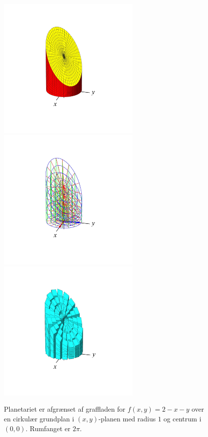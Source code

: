 \begin{figure}[h]
\centerline{\includegraphics[height=70mm]{FIGS/plotGrafVol1} \includegraphics[height=70mm]{FIGS/plotGrafVol2} \includegraphics[height=70mm]{FIGS/plotGrafVol3}}
\begin{center}
\caption{\small{Planetariet er afgrænset af graffladen for $f(x,y)= 2-x-y$ over en cirkulær grundplan i $(x,y)$-planen med radius $1$ og centrum i $(0,0)$. Rumfanget er $2\pi$.}}
\label{figGrafVol}
\end{center}
\end{figure}

